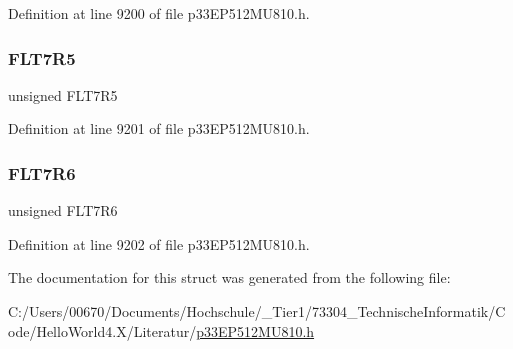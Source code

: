 Definition at line 9200 of file p33\+E\+P512\+M\+U810.\+h.

\mbox{\label{structtag_r_p_i_n_r43_b_i_t_s_a2064397eb9d480f80dc11382c657a362}} 
\subsubsection{\texorpdfstring{F\+L\+T7\+R5}{FLT7R5}}
{\footnotesize\ttfamily unsigned F\+L\+T7\+R5}



Definition at line 9201 of file p33\+E\+P512\+M\+U810.\+h.

\mbox{\label{structtag_r_p_i_n_r43_b_i_t_s_afef9add16b1f5bd5773823bcf939799a}} 
\subsubsection{\texorpdfstring{F\+L\+T7\+R6}{FLT7R6}}
{\footnotesize\ttfamily unsigned F\+L\+T7\+R6}



Definition at line 9202 of file p33\+E\+P512\+M\+U810.\+h.



The documentation for this struct was generated from the following file\+:\begin{DoxyCompactItemize}
\item 
C\+:/\+Users/00670/\+Documents/\+Hochschule/\+\_\+\+Tier1/73304\+\_\+\+Technische\+Informatik/\+Code/\+Hello\+World4.\+X/\+Literatur/\hyperlink{p33_e_p512_m_u810_8h}{p33\+E\+P512\+M\+U810.\+h}\end{DoxyCompactItemize}
